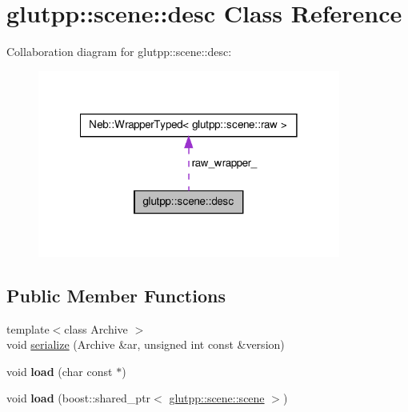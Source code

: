 \hypertarget{classglutpp_1_1scene_1_1desc}{\section{glutpp\-:\-:scene\-:\-:desc \-Class \-Reference}
\label{classglutpp_1_1scene_1_1desc}
}


\-Collaboration diagram for glutpp\-:\-:scene\-:\-:desc\-:
\nopagebreak
\begin{figure}[H]
\begin{center}
\leavevmode
\includegraphics[width=282pt]{classglutpp_1_1scene_1_1desc__coll__graph}
\end{center}
\end{figure}
\subsection*{\-Public \-Member \-Functions}
\begin{DoxyCompactItemize}
\item 
{\footnotesize template$<$class Archive $>$ }\\void \hyperlink{classglutpp_1_1scene_1_1desc_a90063754f769b68b932ee7a54c252d69}{serialize} (\-Archive \&ar, unsigned int const \&version)
\item 
\hypertarget{classglutpp_1_1scene_1_1desc_a7f68fd9fba4752e874f12ed7a4deaeaf}{void {\bfseries load} (char const $\ast$)}\label{classglutpp_1_1scene_1_1desc_a7f68fd9fba4752e874f12ed7a4deaeaf}

\item 
\hypertarget{classglutpp_1_1scene_1_1desc_a7d5bcfef9cb840cde257ce5281ffa5d4}{void {\bfseries load} (boost\-::shared\-\_\-ptr$<$ \hyperlink{classglutpp_1_1scene_1_1scene}{glutpp\-::scene\-::scene} $>$)}\label{classglutpp_1_1scene_1_1desc_a7d5bcfef9cb840cde257ce5281ffa5d4}

\end{DoxyCompactItemize}
